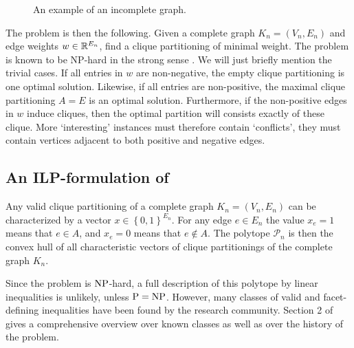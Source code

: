 \begin{figure}[h]
	\centering
	\caption{An example of an incomplete graph.}
	\label{fig:incomplete_graph}
\end{figure}

The \CP problem is then the following.
Given a complete graph $K_n=(V_n,E_n)$ and edge weights $w \in \mathbb{R}^{E_n}$, find a clique partitioning of minimal weight.
The problem is known to be \textsc{NP}-hard in the strong sense \cite{wakabayashiAggregationBinaryRelations1986}.
We will just briefly mention the trivial cases.
If all entries in $w$ are non-negative, the empty clique partitioning is one optimal solution.
Likewise, if all entries are non-positive, the maximal clique partitioning $A = E$ is an optimal solution.
Furthermore, if the non-positive edges in $w$ induce cliques, then the optimal partition will consists exactly of these clique.
More ‘interesting’ instances must therefore contain ‘conflicts’, \ie they must contain vertices adjacent to both positive and negative edges.

\subsection{An ILP-formulation of \CP}\label{subsec:ilp_formulation}
Any valid clique partitioning of a complete graph $K_{n}=(V_{n}, E_{n})$ can be characterized by a vector $x \in \left\{ 0,1 \right\}^{E_{n}}$.
For any edge $e \in E_{n}$ the value $x_{e} = 1$ means that $e \in A$, and $x_{e} = 0$ means that $e \notin A$.
The \CP polytope $\mathscr{P}_{n}$ is then the convex hull of all characteristic vectors of clique partitionings of the complete graph $K_{n}$.

Since the problem is $\mathit{\text{NP}}$-hard, a full description of this polytope by linear inequalities is unlikely, unless $\mathit{\text{P}} = \mathit{\text{NP}}$.
However, many classes of valid and facet-defining inequalities have been found by the research community.
Section 2 of \cite{andresPolyhedralStudyLifted2022} gives a comprehensive overview over known classes as well as over the history of the problem.

